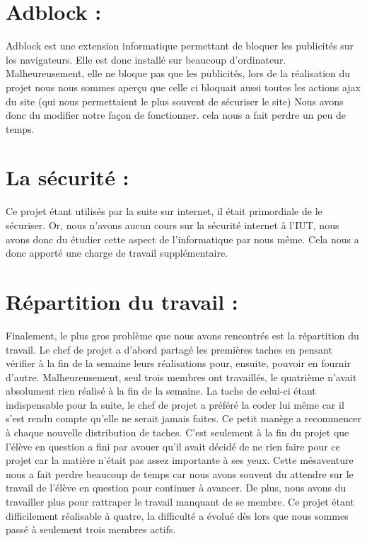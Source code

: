 \documentclass[11pt,a4paper,titlepage]{report}
\begin{document}
\section{Adblock :} 
Adblock est une extension informatique permettant de bloquer les publicités sur les navigateurs. Elle est donc installé sur beaucoup d'ordinateur. 
Malheureusement, elle ne bloque pas que les publicités, lors de la réalisation du projet nous nous sommes aperçu que celle ci bloquait aussi toutes les actions ajax du site (qui nous permettaient le plus souvent de sécuriser le site) 
Nous avons donc du modifier notre façon de fonctionner. cela nous a fait perdre un peu de temps.

\section{La sécurité : }
Ce projet étant utilisés par la suite sur internet, il était primordiale de le sécuriser. Or, nous n'avons aucun cours sur la sécurité internet à l'IUT, nous avons donc du étudier cette aspect de l'informatique par nous même. Cela nous a donc apporté une charge de travail supplémentaire.

\section{Répartition du travail : }
Finalement, le plus gros problème que nous avons rencontrés est la répartition du travail. 
Le chef de projet a d'abord partagé les premières taches en pensant vérifier à la fin de la semaine leurs réalisations pour, ensuite, pouvoir en fournir d'autre. Malheureusement, seul trois membres ont travaillés, le quatrième n'avait absolument rien réalisé à la fin de la semaine. 
La tache de celui-ci étant indispensable pour la suite, le chef de projet a préféré la coder lui même car il s'est rendu compte qu'elle ne serait jamais faites.
Ce petit manège a recommencer à chaque nouvelle distribution de taches. C'est seulement à la fin du projet que l'élève en question a fini par avouer qu'il avait décidé de ne rien faire pour ce projet car la matière n'était pas assez importante à ses yeux. Cette mésaventure nous a fait perdre beaucoup de temps car nous avons souvent du attendre sur le travail de l'élève en question pour continuer à avancer. De plus, nous avons du travailler plus pour rattraper le travail manquant de se membre.
Ce projet étant difficilement réalisable à quatre, la difficulté a évolué dès lors que nous sommes passé à seulement trois membres actifs. 
\end{document}
